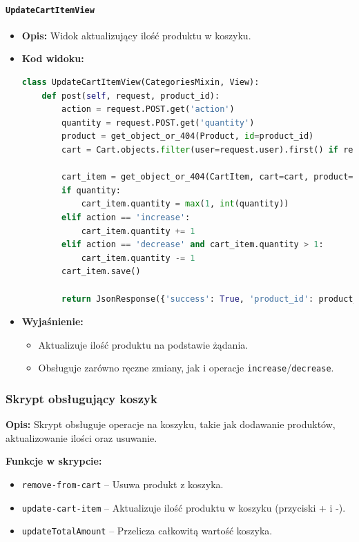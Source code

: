 \documentclass[12pt,a4paper,oneside]{article}
\theoremstyle{definition}
\numberwithin{equation}{section}
\begin{document}
\paragraph{\texttt{UpdateCartItemView}}
\begin{itemize}
    \item \textbf{Opis:} Widok aktualizujący ilość produktu w koszyku.
    \item \textbf{Kod widoku:}
\begin{lstlisting}[language=Python, caption=Kod widoku UpdateCartItemView]
class UpdateCartItemView(CategoriesMixin, View):
    def post(self, request, product_id):
        action = request.POST.get('action')
        quantity = request.POST.get('quantity')
        product = get_object_or_404(Product, id=product_id)
        cart = Cart.objects.filter(user=request.user).first() if request.user.is_authenticated else Cart.objects.filter(id=request.session.get('cart_id')).first()

        cart_item = get_object_or_404(CartItem, cart=cart, product=product)
        if quantity:
            cart_item.quantity = max(1, int(quantity))
        elif action == 'increase':
            cart_item.quantity += 1
        elif action == 'decrease' and cart_item.quantity > 1:
            cart_item.quantity -= 1
        cart_item.save()

        return JsonResponse({'success': True, 'product_id': product_id, 'quantity': cart_item.quantity})
\end{lstlisting}

    \item \textbf{Wyjaśnienie:}
    \begin{itemize}
        \item Aktualizuje ilość produktu na podstawie żądania.
        \item Obsługuje zarówno ręczne zmiany, jak i operacje \texttt{increase}/\texttt{decrease}.
    \end{itemize}
\end{itemize}


\subsubsection{Skrypt obsługujący koszyk}

\textbf{Opis:}  
Skrypt obsługuje operacje na koszyku, takie jak dodawanie produktów, aktualizowanie ilości oraz usuwanie.

\textbf{Funkcje w skrypcie:}
\begin{itemize}
    \item \texttt{remove-from-cart} – Usuwa produkt z koszyka.
    \item \texttt{update-cart-item} – Aktualizuje ilość produktu w koszyku (przyciski + i -).
    \item \texttt{updateTotalAmount} – Przelicza całkowitą wartość koszyka.
\end{itemize}
\end{document}
